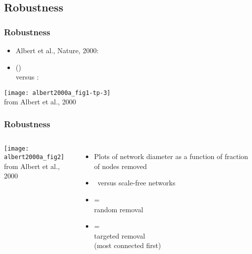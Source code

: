 \subsection{Robustness}

\begin{frame}[label=]
 \frametitle{Robustness}  

 \begin{block}{}
 \begin{itemize}
 \item
   Albert et al., Nature, 2000:\\
   \cite{albert2000a}
 \item 
    (\erdosrenyi)\\
   versus :
 \end{itemize}

 \texttt{[image: albert2000a\_fig1-tp-3]}\\
 {\tiny from Albert et al., 2000}
 \end{block}

\end{frame}

\begin{frame}[label=]
 \frametitle{Robustness}  

 \begin{block}{}
 \begin{columns}
   \texttt{[image: albert2000a\_fig2]}\\
   {\tiny from Albert et al., 2000}
   \begin{itemize}
   \item 
     Plots of network diameter as a function of fraction of nodes removed
   \item 
     \erdosrenyi\ versus scale-free networks
   \item
    = \\
   {random} removal
   \item
    = \\
   {targeted} removal \\
   (most connected first)
   \end{itemize}

 \end{columns}
 \end{block}

\end{frame}


